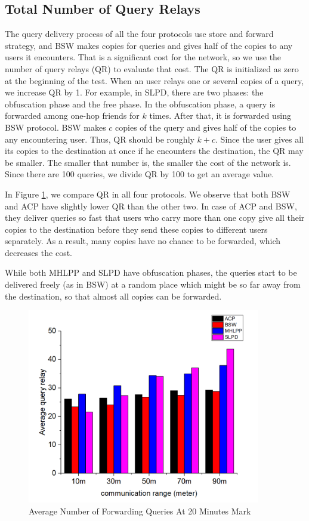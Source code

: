 \subsection{ Total Number of Query Relays}

\noindent The query delivery process of all the four protocols use store and forward strategy, and BSW makes copies for queries and gives half of the copies to any users it encounters. That is a significant cost for the network, so we use the number of query relays (QR) to evaluate that cost. The QR is initialized as zero at the beginning of the test. When an user relays one or several copies of a query, we increase QR by 1. For example, in SLPD, there are two phases: the obfuscation phase and the free phase. In the obfuscation phase, a query is forwarded among one-hop friends for $k$ times. After that, it is forwarded using BSW protocol. BSW makes $c$ copies of the query and gives half of the copies to any encountering user. Thus, QR should be roughly $k+c$. Since the user gives all its copies to the destination at once if he encounters the destination, the QR may be smaller. The smaller that number is, the smaller the cost of the network is. Since there are 100 queries, we divide QR by 100 to get an average value. 

In Figure \ref{fig:F418AverageTotalNumberofForwardingQueriesAt20Minutes}, we compare QR in all four protocols. We observe that both BSW and ACP have slightly lower QR than the other two. In case of ACP and BSW, they deliver queries so fast that users who carry more than one copy give all their copies to the destination before they send these copies to different users separately. As a result, many copies have no chance to be forwarded, which decreases the cost. 

While both MHLPP and SLPD have obfuscation phases, the queries start to be delivered freely (as in BSW) at a random place which might be so far away from the destination, so that almost all copies can be forwarded.

\begin{figure} [hbtp]
\centering 
\includegraphics[width=4.0in]{olgraph/QrCr.png}
\caption{Average Number of Forwarding Queries At 20 Minutes Mark} 
\label{fig:F418AverageTotalNumberofForwardingQueriesAt20Minutes} %
\end{figure}

